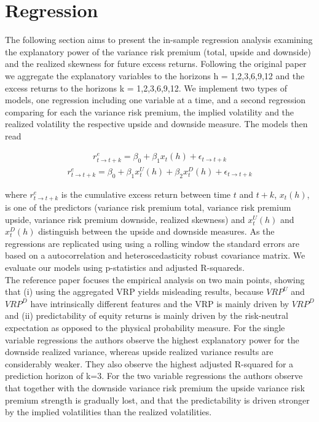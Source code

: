 \documentclass{article}
\begin{document}
\section{Regression}

The following section aims to present the in-sample regression analysis examining the explanatory power of the variance risk premium (total, upside and downside) and the realized skewness for future excess returns. Following the original paper we aggregate the explanatory variables to the horizons h = 1,2,3,6,9,12 and the excess returns to the horizons k = 1,2,3,6,9,12. We implement two types of models, one regression including one variable at a time, and a second regression comparing for each the variance risk premium, the implied volatility and the realized volatility the respective upside and downside measure. The models then read

\begin{align}\label{eq:reg1}
r_{t \rightarrow t+k}^{e} = \beta_{0} + \beta_{1}x_{t}(h) + \epsilon_{t \rightarrow t+k}
\end{align}
\begin{align}\label{eq:reg2}
r_{t \rightarrow t+k}^{e} = \beta_{0} + \beta_{1}x_{t}^{U}(h) + \beta_{2}x_{t}^{D}(h) +  \epsilon_{t \rightarrow t+k}
\end{align}

where $r_{t \rightarrow t+k}^{e}$ is the cumulative excess return between time $t$ and $t+k$, $x_{t}(h)$, is one of the predictors (variance risk premium total, variance risk premium upside, variance risk premium downside, realized skewness) and $x_{t}^{U}(h)$ and $x_{t}^{D}(h)$ distinguish between the upside and downside measures. As the regressions are replicated using using a rolling window the standard errors are based on a autocorrelation and heteroscedasticity robust covariance matrix. We evaluate our models using p-statistics and adjusted R-squareds.\\

The reference paper focuses the empirical analysis on two main points, showing that (i) using the aggregated VRP yields misleading results, because $VRP^{U}$ and $VRP^{D}$ have intrinsically different features and the VRP is mainly driven by $VRP^{D}$ and (ii) predictability of equity returns is mainly driven by the risk-neutral expectation as opposed to the physical probability measure. For the single variable regressions the authors observe the highest explanatory power for the downside realized variance, whereas upside realized variance results are considerably weaker. They also observe the highest adjusted R-squared for a prediction horizon of k=3. For the two variable regressions the authors observe that together with the downside variance risk premium the upside variance risk premium strength is gradually lost, and that the predictability is driven stronger by the implied volatilities than the realized volatilities.\\
\end{document}
